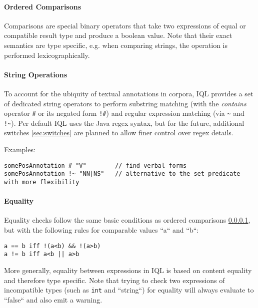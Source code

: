 \documentclass[11pt]{article}
\begin{document}
\paragraph{Ordered Comparisons}
\label{sec:ordered-comparisons}

Comparisons are special binary operators that take two expressions of equal or compatible result type and produce a boolean value. Note that their exact semantics are type specific, e.g. when comparing strings, the operation is performed lexicographically.

\paragraph{String Operations}
\label{sec:string-operations}

To account for the ubiquity of textual annotations in corpora, IQL provides a set of dedicated string operators to perform substring matching (with the \textit{contains} operator \texttt{\#} or its negated form \texttt{!\#}) and regular expression matching (via \texttt{\textasciitilde} and \texttt{!\textasciitilde}). Per default IQL uses the Java regex syntax, but for the future, additional switches \cref{sec:switches} are planned to allow finer control over regex details.

Examples:

\begin{verbatim}
somePosAnnotation # "V"        // find verbal forms
somePosAnnotation !~ "NN|NS"   // alternative to the set predicate with more flexibility
\end{verbatim}

\paragraph{Equality}
\label{sec:equality}

Equality checks follow the same basic conditions as ordered comparisons \cref{sec:ordered-comparisons}, but with the following rules for comparable values ``a`` and ``b``:

\begin{verbatim}
a == b iff !(a<b) && !(a>b)
a != b iff a<b || a>b
\end{verbatim}

More generally, equality between expressions in IQL is based on content equality and therefore type specific.
Note that trying to check two expressions of incompatible types (such as \texttt{int} and ``string``) for equality will always evaluate to ``false`` and also emit a warning. 
\end{document}
